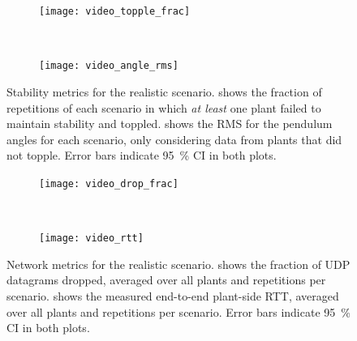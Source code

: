 \begin{figure}
    \centering
    \begin{subfigure}[h]{\columnwidth}
        \centering
        \texttt{[image: video\_topple\_frac]}
        \caption{}\label{fig:video:toppled}
    \end{subfigure}\\%
    \begin{subfigure}[h]{\columnwidth}
        \centering
        \texttt{[image: video\_angle\_rms]}
        \caption{}\label{fig:video:rms}
    \end{subfigure}%
    \caption{
        Stability metrics for the realistic scenario.
         shows the fraction of repetitions of each scenario in which \emph{at least} one plant failed to maintain stability and toppled.
         shows the \ac{RMS} for the pendulum angles for each scenario, only considering data from plants that did not topple.
        Error bars indicate \SI{95}{\percent} \ac{CI} in both plots.
    }\label{fig:video:stability}
\end{figure}

\begin{figure}
    \centering
    \begin{subfigure}[h]{\columnwidth}
        \centering
        \texttt{[image: video\_drop\_frac]}
        \caption{}\label{fig:video:drop}
    \end{subfigure}\\%
    \begin{subfigure}[h]{\columnwidth}
        \centering
        \texttt{[image: video\_rtt]}
        \caption{}\label{fig:video:rtt}
    \end{subfigure}%
    \caption{
        Network metrics for the realistic scenario.
         shows the fraction of \ac{UDP} datagrams dropped, averaged over all plants and repetitions per scenario.
         shows the measured end-to-end plant-side \ac{RTT}, averaged over all plants and repetitions per scenario.
        Error bars indicate \SI{95}{\percent} \ac{CI} in both plots.
    }\label{fig:video:network}
\end{figure}